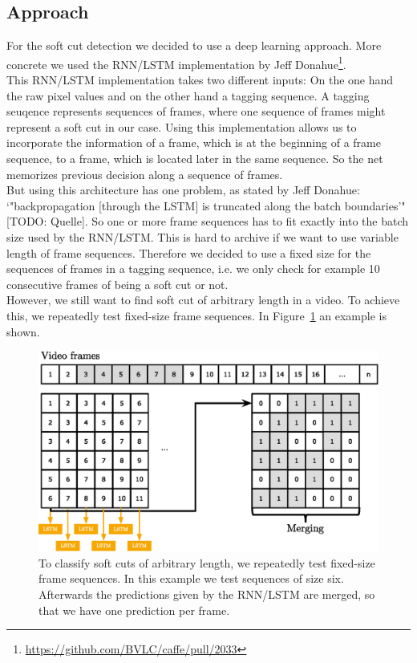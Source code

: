\subsection{Approach}
\label{sec:soft_cut_approach}

For the soft cut detection we decided to use a deep learning approach.
More concrete we used the RNN/LSTM implementation by Jeff Donahue\footnote{\url{https://github.com/BVLC/caffe/pull/2033}}. \\
This RNN/LSTM implementation takes two different inputs: On the one hand the raw pixel values and on the other hand a tagging sequence.
A tagging seuqence represents sequences of frames, where one sequence of frames might represent a soft cut in our case.
Using this implementation allows us to incorporate the information of a frame, which is at the beginning of a frame sequence, to a frame, which is located later in the same sequence.
So the net memorizes previous decision along a sequence of frames. \\
But using this architecture has one problem, as stated by Jeff Donahue: `"backpropagation [through the LSTM] is truncated along the batch boundaries'" [TODO: Quelle].
So one or more frame sequences has to fit exactly into the batch size used by the RNN/LSTM.
This is hard to archive if we want to use variable length of frame sequences.
Therefore we decided to use a fixed size for the sequences of frames in a tagging sequence, i.e. we only check for example 10 consecutive frames of being a soft cut or not.  \\
However, we still want to find soft cut of arbitrary length in a video.
To achieve this, we repeatedly test fixed-size frame sequences.
In Figure~\ref{fig:soft_cut_approach} an example is shown.

\begin{figure}[!htb]
	\centering
	\includegraphics[scale=.7]{images/soft_cut_approach.eps}
	\caption{To classify soft cuts of arbitrary length, we repeatedly test fixed-size frame sequences. In this example we test sequences of size six. Afterwards the predictions given by the RNN/LSTM are merged, so that we have one prediction per frame.}
	\label{fig:soft_cut_approach}
\end{figure}

